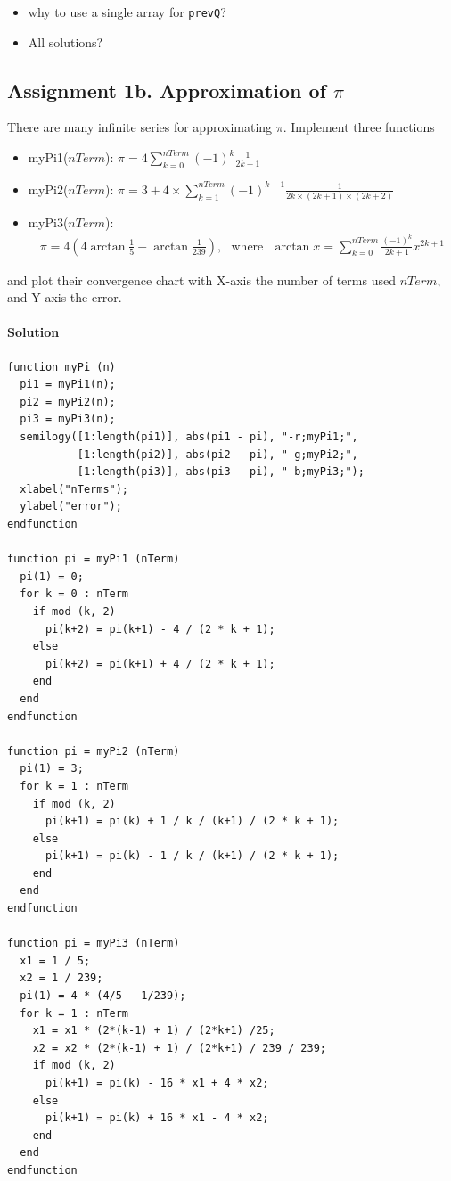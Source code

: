 \documentclass[12pt,a4paper,hidelinks,fleqn]{article}            %
\begin{document}
\begin{itemize}
\item why to use a single array for \verb=prevQ=?
\item All solutions?
\end{itemize}

\subsection*{Assignment 1b. Approximation of $\pi$}
There are many infinite series for approximating $\pi$.
Implement three functions 
\begin{itemize}
\item myPi1($nTerm$): $\displaystyle \pi = 4 \sum_{k=0}^{nTerm} (-1)^{k}\frac{1}{2k+1}$
\item myPi2($nTerm$): $\displaystyle \pi = 3 + 4 \times \sum_{k=1}^{nTerm}(-1)^{k-1}\frac{1}{2k \times (2k+1) \times (2k+2)}$
\item myPi3($nTerm$): 
\begin{align*}
\pi = 4(4\arctan \frac{1}{5} - \arctan \frac{1}{239}), ~~~\text{where} 
~~~\arctan x = \sum_{k=0}^{nTerm} \frac{(-1)^k} {2k+1} x^{2k+1}
\end{align*}
\end{itemize}
and plot their convergence chart with X-axis the number of terms used $nTerm$, and Y-axis the error.

\paragraph{Solution}
\begin{verbatim}
function myPi (n)
  pi1 = myPi1(n);
  pi2 = myPi2(n);
  pi3 = myPi3(n);
  semilogy([1:length(pi1)], abs(pi1 - pi), "-r;myPi1;", 
           [1:length(pi2)], abs(pi2 - pi), "-g;myPi2;",
           [1:length(pi3)], abs(pi3 - pi), "-b;myPi3;");
  xlabel("nTerms");
  ylabel("error");
endfunction

function pi = myPi1 (nTerm)
  pi(1) = 0;
  for k = 0 : nTerm
    if mod (k, 2)
      pi(k+2) = pi(k+1) - 4 / (2 * k + 1);
    else
      pi(k+2) = pi(k+1) + 4 / (2 * k + 1);
    end
  end
endfunction
  
function pi = myPi2 (nTerm)
  pi(1) = 3;
  for k = 1 : nTerm
    if mod (k, 2)
      pi(k+1) = pi(k) + 1 / k / (k+1) / (2 * k + 1);
    else
      pi(k+1) = pi(k) - 1 / k / (k+1) / (2 * k + 1);
    end
  end
endfunction
  
function pi = myPi3 (nTerm)
  x1 = 1 / 5;
  x2 = 1 / 239;
  pi(1) = 4 * (4/5 - 1/239);
  for k = 1 : nTerm
    x1 = x1 * (2*(k-1) + 1) / (2*k+1) /25;
    x2 = x2 * (2*(k-1) + 1) / (2*k+1) / 239 / 239;
    if mod (k, 2)
      pi(k+1) = pi(k) - 16 * x1 + 4 * x2;
    else
      pi(k+1) = pi(k) + 16 * x1 - 4 * x2;
    end
  end
endfunction
\end{verbatim}
\end{document}
